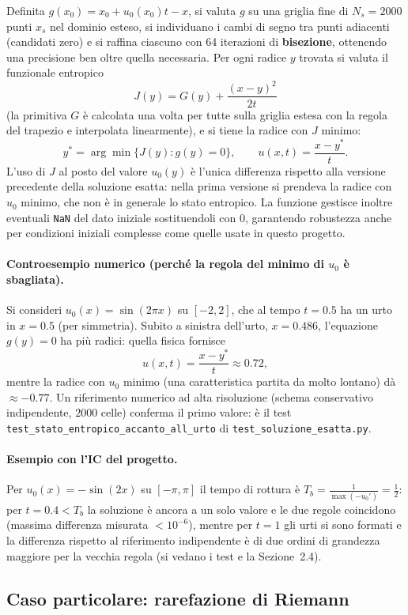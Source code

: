 \documentclass[12pt]{article}
\begin{document}
Definita $g(x_0)=x_0+u_0(x_0)t-x$, si valuta $g$ su una griglia fine di $N_s=2000$ punti $x_s$ nel dominio esteso, si individuano i cambi di segno tra punti adiacenti (candidati zero) e si raffina ciascuno con 64 iterazioni di \textbf{bisezione}, ottenendo una precisione ben oltre quella necessaria. Per ogni radice $y$ trovata si valuta il funzionale entropico
\[
J(y) = G(y) + \frac{(x-y)^2}{2t}
\]
(la primitiva $G$ è calcolata una volta per tutte sulla griglia estesa con la regola del trapezio e interpolata linearmente), e si tiene la radice con $J$ minimo:
\[
y^* = \arg\min\{J(y) : g(y)=0\}, \qquad u(x,t) = \frac{x-y^*}{t}.
\]
L'uso di $J$ al posto del valore $u_0(y)$ è l'unica differenza rispetto alla versione precedente della soluzione esatta: nella prima versione si prendeva la radice con $u_0$ minimo, che non è in generale lo stato entropico.
La funzione gestisce inoltre eventuali \texttt{NaN} del dato iniziale sostituendoli con 0, garantendo robustezza anche per condizioni iniziali complesse come quelle usate in questo progetto.

\paragraph{Controesempio numerico (perché la regola del minimo di $u_0$ è sbagliata).} Si consideri $u_0(x)=\sin(2\pi x)$ su $[-2,2]$, che al tempo $t=0.5$ ha un urto in $x=0.5$ (per simmetria). Subito a sinistra dell'urto, $x=0.486$, l'equazione $g(y)=0$ ha più radici: quella fisica fornisce
\[
u(x,t)=\frac{x-y^*}{t}\approx 0.72,
\]
mentre la radice con $u_0$ minimo (una caratteristica partita da molto lontano) dà $\approx -0.77$. Un riferimento numerico ad alta risoluzione (schema conservativo indipendente, $2000$ celle) conferma il primo valore: è il test \texttt{test\_stato\_entropico\_accanto\_all\_urto} di \texttt{test\_soluzione\_esatta.py}.

\paragraph{Esempio con l'IC del progetto.} Per $u_0(x)=-\sin(2x)$ su $[-\pi,\pi]$ il tempo di rottura è $T_b=\frac{1}{\max(-u_0')}=\frac12$: per $t=0.4<T_b$ la soluzione è ancora a un solo valore e le due regole coincidono (massima differenza misurata $<10^{-6}$), mentre per $t=1$ gli urti si sono formati e la differenza rispetto al riferimento indipendente è di due ordini di grandezza maggiore per la vecchia regola (si vedano i test e la Sezione~2.4).
\newpage
\subsection{Caso particolare: rarefazione di Riemann}
\end{document}

